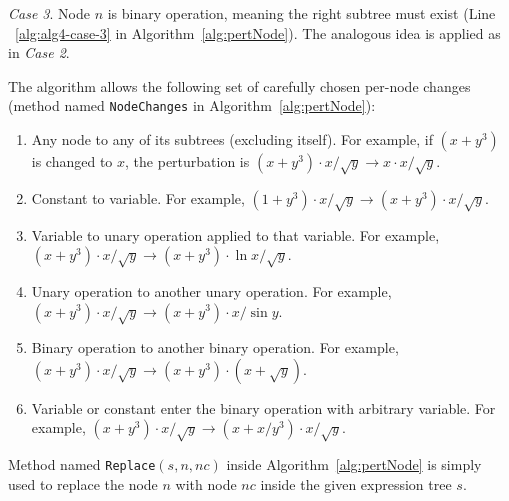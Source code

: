 \documentclass[a4paper,12pt]{elsarticle}
\begin{document}
\emph{Case 3}. 
Node $n$ is binary operation, meaning the right subtree must exist (Line ~\ref{alg:alg4-case-3} in Algorithm~\ref{alg:pertNode}). 
The analogous idea is applied as in \emph{Case 2}. 

The algorithm allows the following set of carefully chosen per-node changes (method named \texttt{NodeChanges} in Algorithm~\ref{alg:pertNode}): 

\begin{enumerate}
	\item Any node to any of its subtrees (excluding itself). For example, if $(x+y^3)$ is changed to $x$, the perturbation is $(x+y^3)\cdot x/\sqrt{y} \rightarrow x\cdot x/\sqrt{y}$. 
	\item Constant to variable. For example,  $(1+y^3)\cdot x/\sqrt{y} \rightarrow (x+y^3)\cdot x/\sqrt{y}$.
	\item Variable to unary operation applied to that variable. For example,  $(x+y^3)\cdot x/\sqrt{y} \rightarrow (x+y^3)\cdot \ln{x}/\sqrt{y}$.
	\item Unary operation to another unary operation. For example,  $(x+y^3)\cdot x/\sqrt{y} \rightarrow (x+y^3)\cdot x/\sin{y}$.
	\item Binary operation to another binary operation. For example,  $(x+y^3)\cdot x/\sqrt{y} \rightarrow (x+y^3)\cdot (x + \sqrt{y})$. 
	\item Variable or constant enter the binary operation with arbitrary variable. For example,  $(x+y^3)\cdot x/\sqrt{y} \rightarrow (x+x/y^3)\cdot x/\sqrt{y}$. 
\end{enumerate}

Method named \texttt{Replace}$(s, n, nc)$ inside Algorithm~\ref{alg:pertNode} is simply used to replace the node $n$ with node $nc$ inside the given expression tree $s$.    


\end{document}
